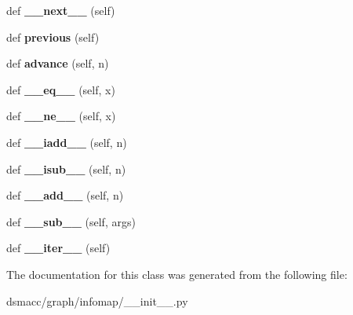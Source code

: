 \begin{DoxyCompactItemize}
def {\bfseries \+\_\+\+\_\+next\+\_\+\+\_\+} (self)
\item 
\mbox{\label{classdsmacc_1_1graph_1_1infomap_1_1SwigPyIterator_adb92e85bc46df46a7320452361630369}} 
def {\bfseries previous} (self)
\item 
\mbox{\label{classdsmacc_1_1graph_1_1infomap_1_1SwigPyIterator_ad1e4e155a50b610b78c9f8ced232e77e}} 
def {\bfseries advance} (self, n)
\item 
\mbox{\label{classdsmacc_1_1graph_1_1infomap_1_1SwigPyIterator_a94c0589cf046c6b43343a04abec4c6bc}} 
def {\bfseries \+\_\+\+\_\+eq\+\_\+\+\_\+} (self, x)
\item 
\mbox{\label{classdsmacc_1_1graph_1_1infomap_1_1SwigPyIterator_a13010f9e0af3002585d7e1c8a9f0c10e}} 
def {\bfseries \+\_\+\+\_\+ne\+\_\+\+\_\+} (self, x)
\item 
\mbox{\label{classdsmacc_1_1graph_1_1infomap_1_1SwigPyIterator_a98471a9c7e5fcbec48a876f44ed14a1f}} 
def {\bfseries \+\_\+\+\_\+iadd\+\_\+\+\_\+} (self, n)
\item 
\mbox{\label{classdsmacc_1_1graph_1_1infomap_1_1SwigPyIterator_a5b3a2184e7c453a35add3e264192b88b}} 
def {\bfseries \+\_\+\+\_\+isub\+\_\+\+\_\+} (self, n)
\item 
\mbox{\label{classdsmacc_1_1graph_1_1infomap_1_1SwigPyIterator_a42a8c6ae6bf0c75efaa659faed6109b4}} 
def {\bfseries \+\_\+\+\_\+add\+\_\+\+\_\+} (self, n)
\item 
\mbox{\label{classdsmacc_1_1graph_1_1infomap_1_1SwigPyIterator_a7d3c9bb6a41e34d5ad81c2270af1715b}} 
def {\bfseries \+\_\+\+\_\+sub\+\_\+\+\_\+} (self, args)
\item 
\mbox{\label{classdsmacc_1_1graph_1_1infomap_1_1SwigPyIterator_a82cf93a7741e147b5261a337f3ef9c41}} 
def {\bfseries \+\_\+\+\_\+iter\+\_\+\+\_\+} (self)
\end{DoxyCompactItemize}


The documentation for this class was generated from the following file\+:\begin{DoxyCompactItemize}
\item 
dsmacc/graph/infomap/\+\_\+\+\_\+init\+\_\+\+\_\+.\+py\end{DoxyCompactItemize}
